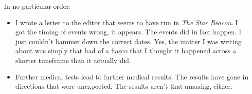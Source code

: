 In no particular order:

\begin{itemize}
\tightlist
\item
  I wrote a letter to the editor that seems to have run in \emph{The
  Star Beacon}. I got the timing of events wrong, it appears. The events
  did in fact happen. I just couldn't hammer down the correct dates.
  Yes, the matter I was writing about was simply that bad of a fiasco
  that I thought it happened across a shorter timeframe than it actually
  did.
\item
  Further medical tests lead to further medical results. The results
  have gone in directions that were unexpected. The results aren't that
  amusing, either.
\end{itemize}
